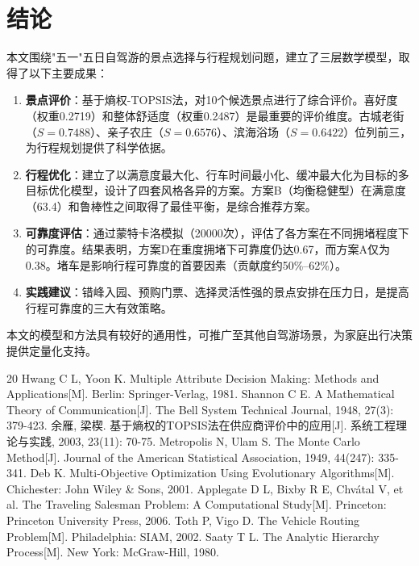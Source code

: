 \documentclass[12pt,a4paper]{ctexart}
\begin{document}
\section{结论}

本文围绕"五一"五日自驾游的景点选择与行程规划问题，建立了三层数学模型，取得了以下主要成果：

\begin{enumerate}
    \item \textbf{景点评价}：基于熵权-TOPSIS法，对10个候选景点进行了综合评价。喜好度（权重0.2719）和整体舒适度（权重0.2487）是最重要的评价维度。古城老街（$S=0.7488$）、亲子农庄（$S=0.6576$）、滨海浴场（$S=0.6422$）位列前三，为行程规划提供了科学依据。

    \item \textbf{行程优化}：建立了以满意度最大化、行车时间最小化、缓冲最大化为目标的多目标优化模型，设计了四套风格各异的方案。方案B（均衡稳健型）在满意度（63.4）和鲁棒性之间取得了最佳平衡，是综合推荐方案。

    \item \textbf{可靠度评估}：通过蒙特卡洛模拟（20000次），评估了各方案在不同拥堵程度下的可靠度。结果表明，方案D在重度拥堵下可靠度仍达0.67，而方案A仅为0.38。堵车是影响行程可靠度的首要因素（贡献度约50\%--62\%）。

    \item \textbf{实践建议}：错峰入园、预购门票、选择灵活性强的景点安排在压力日，是提高行程可靠度的三大有效策略。
\end{enumerate}

本文的模型和方法具有较好的通用性，可推广至其他自驾游场景，为家庭出行决策提供定量化支持。

\begin{thebibliography}{20}
 Hwang C L, Yoon K. Multiple Attribute Decision Making: Methods and Applications[M]. Berlin: Springer-Verlag, 1981.
 Shannon C E. A Mathematical Theory of Communication[J]. The Bell System Technical Journal, 1948, 27(3): 379-423.
 余雁, 梁楔. 基于熵权的TOPSIS法在供应商评价中的应用[J]. 系统工程理论与实践, 2003, 23(11): 70-75.
 Metropolis N, Ulam S. The Monte Carlo Method[J]. Journal of the American Statistical Association, 1949, 44(247): 335-341.
 Deb K. Multi-Objective Optimization Using Evolutionary Algorithms[M]. Chichester: John Wiley \& Sons, 2001.
 Applegate D L, Bixby R E, Chvátal V, et al. The Traveling Salesman Problem: A Computational Study[M]. Princeton: Princeton University Press, 2006.
 Toth P, Vigo D. The Vehicle Routing Problem[M]. Philadelphia: SIAM, 2002.
 Saaty T L. The Analytic Hierarchy Process[M]. New York: McGraw-Hill, 1980.
\end{thebibliography}
\end{document}
